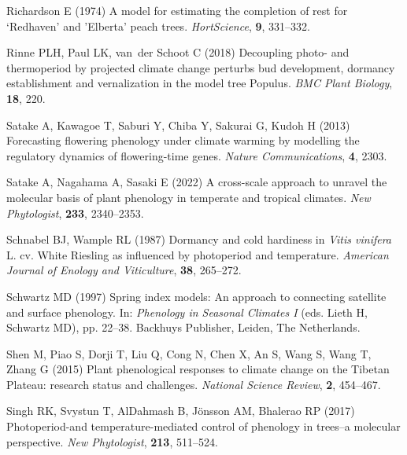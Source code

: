 \documentclass[11pt,letter]{article}
\begin{document}
\begin{thebibliography}{63}
Richardson E (1974) A model for estimating the completion of rest for
  {`Redhaven' and 'Elberta'} peach trees.
\newblock \emph{HortScience}, \textbf{9}, 331--332.

Rinne PLH, Paul LK, van~der Schoot C (2018) {Decoupling photo- and thermoperiod
  by projected climate change perturbs bud development, dormancy establishment
  and vernalization in the model tree Populus}.
\newblock \emph{BMC Plant Biology}, \textbf{18}, 220.

Satake A, Kawagoe T, Saburi Y, Chiba Y, Sakurai G, Kudoh H (2013) Forecasting
  flowering phenology under climate warming by modelling the regulatory
  dynamics of flowering-time genes.
\newblock \emph{Nature Communications}, \textbf{4}, 2303.

Satake A, Nagahama A, Sasaki E (2022) A cross-scale approach to unravel the
  molecular basis of plant phenology in temperate and tropical climates.
\newblock \emph{New Phytologist}, \textbf{233}, 2340--2353.

Schnabel BJ, Wample RL (1987) {Dormancy and cold hardiness in \emph{Vitis
  vinifera} L. cv. White Riesling as influenced by photoperiod and
  temperature}.
\newblock \emph{American Journal of Enology and Viticulture}, \textbf{38},
  265--272.

Schwartz MD (1997) Spring index models: An approach to connecting satellite and
  surface phenology.
\newblock In: \emph{Phenology in Seasonal Climates I} (eds. Lieth H, Schwartz
  MD), pp. 22--38. Backhuys Publisher, Leiden, The Netherlands.

Shen M, Piao S, Dorji T, Liu Q, Cong N, Chen X, An S, Wang S, Wang T, Zhang G
  (2015) {Plant phenological responses to climate change on the Tibetan
  Plateau: research status and challenges}.
\newblock \emph{National Science Review}, \textbf{2}, 454--467.

Singh RK, Svystun T, AlDahmash B, J{\"o}nsson AM, Bhalerao RP (2017)
  Photoperiod-and temperature-mediated control of phenology in trees--a
  molecular perspective.
\newblock \emph{New Phytologist}, \textbf{213}, 511--524.


\end{thebibliography}
\end{document}
